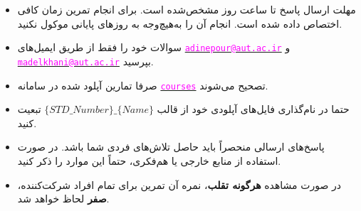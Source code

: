\begin{itemize}
	\small
	\setlength\itemsep{0.05em}
	\item
	مهلت ارسال پاسخ تا ساعت  روز مشخص‌شده است. ﺑﺮای اﻧﺠﺎم ﺗﻤﺮﯾﻦ زﻣﺎن کافی اختصاص‌ داده ‌شده اﺳﺖ. انجام آن را به‌هیچ‌وجه ﺑﻪ روزﻫﺎی پایانی موکول نکنید.
	\item 
	سوالات خود را فقط از طریق ایمیل‌های \href{mailto:adinepour@aut.ac.ir}{\textcolor{magenta}{\texttt{adinepour@aut.ac.ir}}} و \href{mailto:madelkhani@aut.ac.ir}{\textcolor{magenta} {\texttt{madelkhani@aut.ac.ir}}} بپرسید.
	\item 
	صرفا تمارین آپلود شده در سامانه \href{https://courses.aut.ac.ir/}{\textcolor{magenta}{\texttt{courses}}} تصحیح می‌شوند.
	
	\item 
	حتما در نام‌گذاری فایل‌های آپلودی خود از قالب $\{STD\_Number\}\_\{Name\}$ تبعیت کنید.
	
	
	\item
	پاسخ‌های ارسالی منحصراً باید حاصل تلاش‌های فردی شما باشد. در صورت استفاده از منابع خارجی یا هم‌فکری، حتماً این موارد را ذکر کنید.
	
	\item 
	در صورت مشاهده \textbf{هرگونه تقلب}، نمره آن تمرین برای تمام افراد شرکت‌کننده، \textbf{صفر} لحاظ خواهد شد.
\end{itemize}